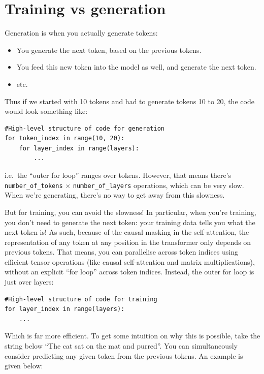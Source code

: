 \documentclass{article}
\begin{document}
\section{Training vs generation}

Generation is when you actually generate tokens:
\begin{itemize}
  \item You generate the next token, based on the previous tokens.
  \item You feed this new token into the model as well, and generate the next token.
  \item etc.
\end{itemize}
Thus if we started with 10 tokens and had to generate tokens 10 to 20, the code would look something like:
\begin{verbatim}
#High-level structure of code for generation
for token_index in range(10, 20):
    for layer_index in range(layers):
        ...
\end{verbatim}
i.e.\ the ``outer for loop'' ranges over tokens.
However, that means there's \verb|number_of_tokens| $\times$ \verb|number_of_layers| operations, which can be very slow.
When we're generating, there's no way to get away from this slowness.

But for training, you can avoid the slowness!
In particular, when you're training, you don't need to generate the next token: your training data tells you what the next token is!
As such, because of the causal masking in the self-attention, the representation of any token at any position in the transformer only depends on previous tokens.
That means, you can parallelise across token indices using efficient tensor operations (like causal self-attention and matrix multiplications), without an explicit ``for loop'' across token indices.
Instead, the outer for loop is just over layers:
\begin{verbatim}
#High-level structure of code for training
for layer_index in range(layers):
    ...
\end{verbatim}
Which is far more efficient.
To get some intuition on why this is possible, take the string below ``The cat sat on the mat and purred''.
You can simultaneously consider predicting any given token from the previous tokens.
An example is given below:
\end{document}

